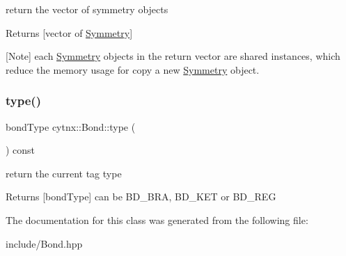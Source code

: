 return the vector of symmetry objects 

\begin{DoxyReturn}{Returns}
\mbox{[}vector of \hyperlink{classcytnx_1_1Symmetry}{Symmetry}\mbox{]}
\end{DoxyReturn}
\mbox{[}Note\mbox{]} each \hyperlink{classcytnx_1_1Symmetry}{Symmetry} objects in the return vector are shared instances, which reduce the memory usage for copy a new \hyperlink{classcytnx_1_1Symmetry}{Symmetry} object. \mbox{\label{classcytnx_1_1Bond_a8517743cec9589ed551114ea7e55fbb1}} 
\subsubsection{\texorpdfstring{type()}{type()}}
{\footnotesize\ttfamily bond\+Type cytnx\+::\+Bond\+::type (\begin{DoxyParamCaption}{ }\end{DoxyParamCaption}) const\hspace{0.3cm}{\ttfamily [inline]}}



return the current tag type 

\begin{DoxyReturn}{Returns}
\mbox{[}bond\+Type\mbox{]} can be B\+D\+\_\+\+B\+RA, B\+D\+\_\+\+K\+ET or B\+D\+\_\+\+R\+EG 
\end{DoxyReturn}


The documentation for this class was generated from the following file\+:\begin{DoxyCompactItemize}
\item 
include/Bond.\+hpp\end{DoxyCompactItemize}
